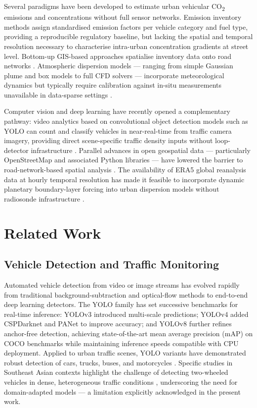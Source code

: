 \documentclass[12pt,a4paper]{article}
\begin{document}
Several paradigms have been developed to estimate urban vehicular CO\textsubscript{2} emissions and concentrations without full sensor networks. Emission inventory methods \cite{EEA2023,IPCC2019} assign standardised emission factors per vehicle category and fuel type, providing a reproducible regulatory baseline, but lacking the spatial and temporal resolution necessary to characterise intra-urban concentration gradients at street level. Bottom-up GIS-based approaches spatialise inventory data onto road networks \cite{Kumar2020,Beloconi2021}. Atmospheric dispersion models --- ranging from simple Gaussian plume and box models to full CFD solvers --- incorporate meteorological dynamics but typically require calibration against in-situ measurements unavailable in data-sparse settings \cite{GromkeRuck2007,Lateb2016}.

Computer vision and deep learning have recently opened a complementary pathway: video analytics based on convolutional object detection models such as YOLO can count and classify vehicles in near-real-time from traffic camera imagery, providing direct scene-specific traffic density inputs without loop-detector infrastructure \cite{RedmonFarhadi2018,Bochkovskiy2020,Ultralytics2023}. Parallel advances in open geospatial data --- particularly OpenStreetMap and associated Python libraries --- have lowered the barrier to road-network-based spatial analysis \cite{Boeing2017,HaklayWeber2008}. The availability of ERA5 global reanalysis data at hourly temporal resolution has made it feasible to incorporate dynamic planetary boundary-layer forcing into urban dispersion models without radiosonde infrastructure \cite{Deng2023,Hersbach2020}.

\section{Related Work}

\subsection{Vehicle Detection and Traffic Monitoring}

Automated vehicle detection from video or image streams has evolved rapidly from traditional background-subtraction and optical-flow methods to end-to-end deep learning detectors. The YOLO family has set successive benchmarks for real-time inference: YOLOv3 \cite{RedmonFarhadi2018} introduced multi-scale predictions; YOLOv4 \cite{Bochkovskiy2020} added CSPDarknet and PANet to improve accuracy; and YOLOv8 \cite{Ultralytics2023} further refines anchor-free detection, achieving state-of-the-art mean average precision (mAP) on COCO benchmarks while maintaining inference speeds compatible with CPU deployment. Applied to urban traffic scenes, YOLO variants have demonstrated robust detection of cars, trucks, buses, and motorcycles \cite{Jiang2022,Mandal2022}. Specific studies in Southeast Asian contexts highlight the challenge of detecting two-wheeled vehicles in dense, heterogeneous traffic conditions \cite{Fabian2021}, underscoring the need for domain-adapted models --- a limitation explicitly acknowledged in the present work.
\end{document}

